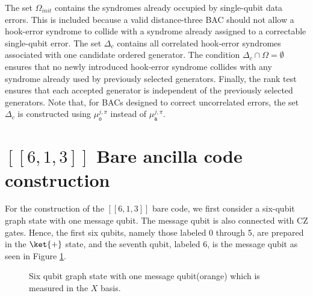 \documentclass[reprint, amsmath,amssymb, aps,pra,
 floatfix,
]{revtex4-2}
\begin{document}
\noindent The set  $\Omega_{init}$ contains the syndromes already occupied by single-qubit data errors.
This is included because a valid distance-three BAC should not allow a hook-error syndrome to collide with a syndrome already assigned to a correctable single-qubit error.
The set $\Delta_c$ contains all correlated hook-error syndromes associated with one candidate ordered generator.
The condition $\Delta_c \cap \Omega = \emptyset$ ensures that no newly introduced hook-error syndrome collides with any syndrome already used by previously selected generators.
Finally, the rank test ensures that each accepted generator is independent of the previously selected generators.
Note that, for BACs designed to correct uncorrelated errors, the set $\Delta_c$ is constructed using $\mu^{j,\pi}_\mathtt{o}$ instead of $\mu^{j,\pi}_\mathtt{a}$.
\section{\texorpdfstring{$[[6,1,3]]$}{[[6,1,3]]} Bare ancilla code construction}
\label{APPENDIX: [[6,1,3]] code}
\noindent For the construction of the $[[6,1,3]]$ bare code, we first consider a six-qubit graph state with one message qubit. The message qubit is also connected with $\mathrm{CZ}$ gates.  
Hence, the first six qubits, namely those labeled 0 through 5, are prepared in the $\ket{+}$ state, and the seventh qubit, labeled 6, is the message qubit as seen in Figure \ref{fig:7 qubit cluster}.
\begin{figure}[h]
    \centering

    \caption{\small{Six qubit graph state with one message qubit(orange) which is measured in the $X$ basis.}}
    \label{fig:7 qubit cluster}
\end{figure}
\end{document}
